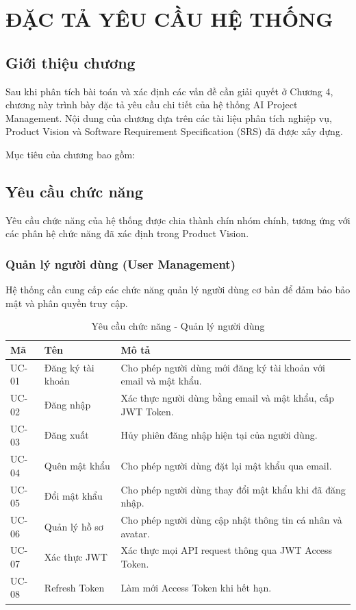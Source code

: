 \documentclass[12pt,a4paper]{report}
\begin{document}
\chapter{ĐẶC TẢ YÊU CẦU HỆ THỐNG}
\label{chap:requirements_specification}

\section{Giới thiệu chương}

Sau khi phân tích bài toán và xác định các vấn đề cần giải quyết ở Chương 4, chương này trình bày đặc tả yêu cầu chi tiết của hệ thống AI Project Management. Nội dung của chương dựa trên các tài liệu phân tích nghiệp vụ, Product Vision và Software Requirement Specification (SRS) đã được xây dựng.

Mục tiêu của chương bao gồm:
\section{Yêu cầu chức năng}

Yêu cầu chức năng của hệ thống được chia thành chín nhóm chính, tương ứng với các phân hệ chức năng đã xác định trong Product Vision.

\subsection{Quản lý người dùng (User Management)}

Hệ thống cần cung cấp các chức năng quản lý người dùng cơ bản để đảm bảo bảo mật và phân quyền truy cập.

\begin{table}[H]
\centering
\caption{Yêu cầu chức năng - Quản lý người dùng}
\begin{tabular}{|p{2.5cm}|p{3cm}|p{8cm}|}
\hline
\textbf{Mã} & \textbf{Tên} & \textbf{Mô tả} \\
\hline
UC-01 & Đăng ký tài khoản & Cho phép người dùng mới đăng ký tài khoản với email và mật khẩu. \\
\hline
UC-02 & Đăng nhập & Xác thực người dùng bằng email và mật khẩu, cấp JWT Token. \\
\hline
UC-03 & Đăng xuất & Hủy phiên đăng nhập hiện tại của người dùng. \\
\hline
UC-04 & Quên mật khẩu & Cho phép người dùng đặt lại mật khẩu qua email. \\
\hline
UC-05 & Đổi mật khẩu & Cho phép người dùng thay đổi mật khẩu khi đã đăng nhập. \\
\hline
UC-06 & Quản lý hồ sơ & Cho phép người dùng cập nhật thông tin cá nhân và avatar. \\
\hline
UC-07 & Xác thực JWT & Xác thực mọi API request thông qua JWT Access Token. \\
\hline
UC-08 & Refresh Token & Làm mới Access Token khi hết hạn. \\
\hline
\end{tabular}
\label{tab:user_management_requirements}
\end{table}
\end{document}

